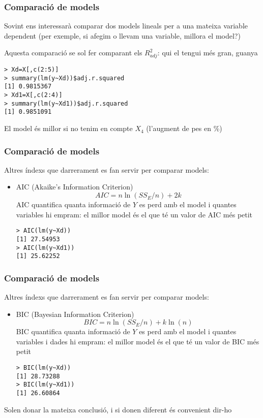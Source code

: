 \documentclass[12pt,t]{beamer}
\renewcommand{\emph}[1]{{\color{red}#1}}
\theoremstyle{plain}
\theoremstyle{definition}
\begin{document}
\begin{frame}[fragile]
\frametitle{Comparació de models}
Sovint ens interessarà comparar dos models lineals per a una mateixa variable dependent (per exemple, si afegim o llevam una variable, millora el model?)
\medskip

Aquesta comparació se sol fer comparant els $R^2_{adj}$: qui el tengui més gran, guanya
\begin{verbatim}
> Xd=X[,c(2:5)]
> summary(lm(y~Xd))$adj.r.squared
[1] 0.9815367
> Xd1=X[,c(2:4)]
> summary(lm(y~Xd1))$adj.r.squared
[1] 0.9851091
\end{verbatim}
El model és millor si  no tenim en compte $X_4$ (l'augment de pes en \%)
\end{frame}

\begin{frame}[fragile]
\frametitle{Comparació de models}

Altres índexs que darrerament es fan servir per comparar models:
\begin{itemize}
\item \emph{AIC} (\emph{Akaike's Information Criterion})
$$
AIC=n\ln(SS_E/n)+2k
$$
AIC quantifica quanta informació de $Y$ es perd amb el model i quantes variables hi empram: el millor model és el que té un valor de AIC més petit
\begin{verbatim}
> AIC(lm(y~Xd))
[1] 27.54953
> AIC(lm(y~Xd1))
[1] 25.62252
\end{verbatim}
\end{itemize}
\end{frame}



\begin{frame}[fragile]
\frametitle{Comparació de models}

Altres índexs que darrerament es fan servir per comparar models:
\begin{itemize}
\item \emph{BIC} (\emph{Bayesian Information Criterion})
$$
BIC=n\ln(SS_E/n)+k\ln(n)
$$
BIC quantifica quanta informació de $Y$ es perd amb el model i quantes variables i dades hi empram: el millor model és el que té un valor de BIC més petit
\begin{verbatim}
> BIC(lm(y~Xd))
[1] 28.73288
> BIC(lm(y~Xd1))
[1] 26.60864
\end{verbatim}
\end{itemize}
Solen donar la mateixa conclusió, i si donen diferent és convenient dir-ho
\end{frame}
\end{document}
